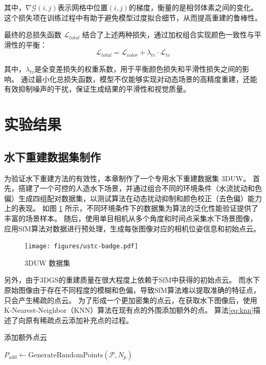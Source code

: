 其中，$\nabla \mathcal{G}(i,j)$表示网格中位置$(i,j)$的梯度，衡量的是相邻体素之间的变化。这个损失项在训练过程中有助于避免模型过度拟合细节，从而提高重建的鲁棒性。

最终的总损失函数 $\mathcal{L}_{total}$ 结合了上述两种损失，通过加权组合实现颜色一致性与平滑性的平衡：
$$
\mathcal{L}_{total} = \mathcal{L}_{color} + \lambda_{tv} \cdot \mathcal{L}_{tv}
$$

其中，$\lambda_{tv}$是全变差损失的权重系数，用于平衡颜色损失和平滑性损失之间的影响。
通过最小化总损失函数，模型不仅能够实现对动态场景的高精度重建，还能有效抑制噪声的干扰，保证生成结果的平滑性和视觉质量。

\section{实验结果}
\subsection{水下重建数据集制作}
为验证水下重建方法的有效性，本章制作了一个专用水下重建数据集 3DUW。
首先，搭建了一个可控的人造水下场景，并通过组合不同的环境条件（水流扰动和色偏）生成四组配对数据集，以测试算法在动态扰动抑制和颜色校正（去色偏）能力上的表现。
如图 \ref{img:3DUW} 所示，不同环境条件下的数据集为算法的泛化性能验证提供了丰富的场景样本。
随后，使用单目相机从多个角度和时间点采集水下场景图像，应用SfM算法\cite{sfm1}\cite{sfm2}对数据进行预处理，生成每张图像对应的相机位姿信息和初始点云。
\begin{figure}
    \centering
    \texttt{[image: figures/ustc-badge.pdf]}
    \caption{3DUW 数据集}
    \label{img:3DUW}
\end{figure}

另外，由于3DGS的重建质量在很大程度上依赖于SfM中获得的初始点云。
而水下原始图像由于存在不同程度的模糊和色偏，导致SfM算法难以提取准确的特征点，只会产生稀疏的点云。
为了形成一个更加密集的点云，在获取水下图像后，使用K-Nearest-Neighbor（KNN）算法在现有点的外围添加额外的点。
算法\ref{eq:knn}描述了向原有稀疏点云添加补充点的过程。
\begin{algorithm}[t]
    \caption{\label{eq:knn}添加额外点云}
    
    $P_\text{add} \leftarrow \text{GenerateRandomPoints}(\mathcal{P}, N_p)$
    
\end{algorithm}

